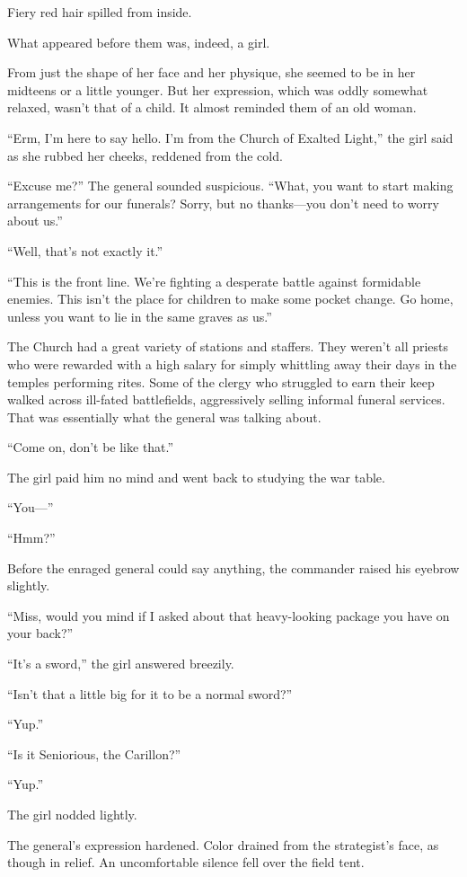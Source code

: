 Fiery red hair spilled from inside.

What appeared before them was, indeed, a girl.

From just the shape of her face and her physique, she seemed to be in her midteens or a little younger. But her expression, which was oddly somewhat relaxed, wasn’t that of a child. It almost reminded them of an old woman.

“Erm, I’m here to say hello. I’m from the Church of Exalted Light,” the girl said as she rubbed her cheeks, reddened from the cold.

“Excuse me?” The general sounded suspicious. “What, you want to start making arrangements for our funerals? Sorry, but no thanks—you don’t need to worry about us.”

“Well, that’s not exactly it.”

“This is the front line. We’re fighting a desperate battle against formidable enemies. This isn’t the place for children to make some pocket change. Go home, unless you want to lie in the same graves as us.”

The Church had a great variety of stations and staffers. They weren’t all priests who were rewarded with a high salary for simply whittling away their days in the temples performing rites. Some of the clergy who struggled to earn their keep walked across ill-fated battlefields, aggressively selling informal funeral services. That was essentially what the general was talking about.

“Come on, don’t be like that.”

The girl paid him no mind and went back to studying the war table.

“You—”

“Hmm?”

Before the enraged general could say anything, the commander raised his eyebrow slightly.

“Miss, would you mind if I asked about that heavy-looking package you have on your back?”

“It’s a sword,” the girl answered breezily.

“Isn’t that a little big for it to be a normal sword?”

“Yup.”

“Is it Seniorious, the Carillon?”

“Yup.”

The girl nodded lightly.

The general’s expression hardened. Color drained from the strategist’s face, as though in relief. An uncomfortable silence fell over the field tent.

